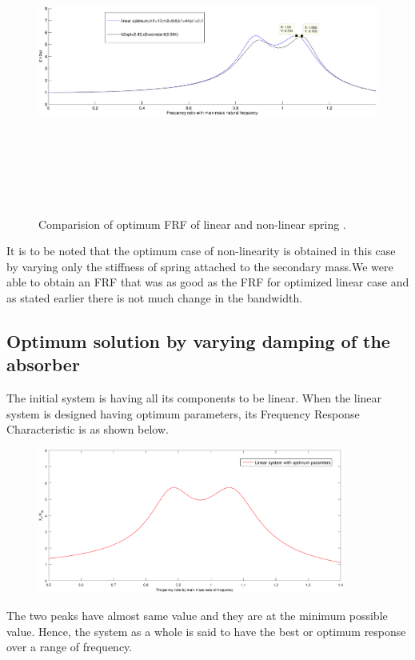 \begin{figure}[h!]
  \includegraphics[width=16cm,height=10cm]{"figures/nonlinearity_primaryymass_3b_effect of secondaryspring_only optimums"}
  \caption{Comparision of optimum FRF of linear and non-linear spring .}
  \label{fig:optimum stiffness}
\end{figure}

It is to be noted that  the optimum case of non-linearity is obtained in this case by varying only the stiffness of spring attached to the secondary mass.We were able to obtain an FRF that was as good as the FRF for optimized linear case and as stated earlier there is not much change in the bandwidth.

\subsection{Optimum solution by varying damping of the absorber}
The initial system is having all its components to be linear. When the linear system is designed having optimum parameters, its Frequency Response Characteristic is as shown below.\\[0.2in]
\begin{figure}[h!]
\includegraphics[width=0.9\textwidth]{"figures/linear"}\\[0.1in]
\end{figure}
The two peaks have almost same value and they are at the minimum possible value. Hence, the system as a whole is said to have the best or optimum response over a range of frequency.

